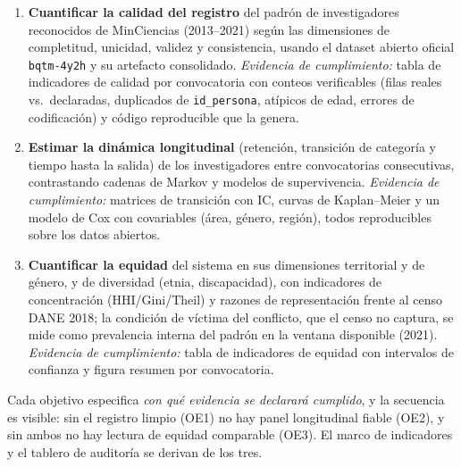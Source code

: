 \begin{enumerate}
  \item \textbf{Cuantificar la calidad del registro} del padrón de
        investigadores reconocidos de MinCiencias (2013--2021) según las
        dimensiones de completitud, unicidad, validez y consistencia, usando
        el dataset abierto oficial \texttt{bqtm-4y2h} y su artefacto
        consolidado.
        \emph{Evidencia de cumplimiento:} tabla de indicadores de calidad por
        convocatoria con conteos verificables (filas reales vs.\ declaradas,
        duplicados de \texttt{id\_persona}, atípicos de edad, errores de
        codificación) y código reproducible que la genera.

  \item \textbf{Estimar la dinámica longitudinal} (retención, transición de
        categoría y tiempo hasta la salida) de los investigadores entre
        convocatorias consecutivas, contrastando cadenas de Markov y modelos
        de supervivencia.
        \emph{Evidencia de cumplimiento:} matrices de transición con IC,
        curvas de Kaplan--Meier y un modelo de Cox con covariables (área,
        género, región), todos reproducibles sobre los datos abiertos.

  \item \textbf{Cuantificar la equidad} del sistema en sus dimensiones
        territorial y de género, y de diversidad (etnia, discapacidad),
        con indicadores de concentración (HHI/Gini/Theil) y razones de
        representación frente al censo DANE 2018; la condición de víctima del
        conflicto, que el censo no captura, se mide como prevalencia interna
        del padrón en la ventana disponible (2021).
        \emph{Evidencia de cumplimiento:} tabla de indicadores de equidad con
        intervalos de confianza y figura resumen por convocatoria.
\end{enumerate}

Cada objetivo especifica \emph{con qué evidencia se declarará cumplido}, y la
secuencia es visible: sin el registro limpio (OE1) no hay panel longitudinal
fiable (OE2), y sin ambos no hay lectura de equidad comparable (OE3). El
marco de indicadores y el tablero de auditoría se derivan de los tres.
